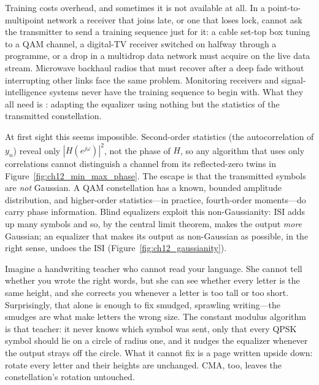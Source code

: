 Training costs overhead, and sometimes it is not available at all. In a point-to-multipoint
network a receiver that joins late, or one that loses lock, cannot ask the transmitter to send a
training sequence just for it: a cable set-top box tuning to a QAM channel, a digital-TV receiver
switched on halfway through a programme, or a drop in a multidrop data network must acquire on the
live data stream. Microwave backhaul radios that must recover after a deep fade without
interrupting other links face the same problem. Monitoring receivers and signal-intelligence
systems never have the training sequence to begin with. What they all need is : adapting the equalizer using nothing but the statistics of the transmitted
constellation.


At first sight this seems impossible. Second-order statistics (the autocorrelation of $y_n$) reveal
only $|H(e^{j\omega})|^2$, not the phase of $H$, so any algorithm that uses only correlations cannot
distinguish a channel from its reflected-zero twins in Figure~\ref{fig:ch12_min_max_phase}. The escape
is that the transmitted symbols are \emph{not} Gaussian. A QAM constellation has a known, bounded
amplitude distribution, and higher-order statistics---in practice, fourth-order moments---do carry
phase information. Blind equalizers exploit this non-Gaussianity: ISI adds up many symbols and so,
by the central limit theorem, makes the output \emph{more} Gaussian; an equalizer that makes its
output as non-Gaussian as possible, in the right sense, undoes the ISI
(Figure~\ref{fig:ch12_gaussianity}).

\begin{analogy}
Imagine a handwriting teacher who cannot read your language. She cannot tell whether you wrote the
right words, but she can see whether every letter is the same height, and she corrects you whenever
a letter is too tall or too short. Surprisingly, that alone is enough to fix smudged, sprawling
writing---the smudges are what make letters the wrong size. The constant modulus algorithm is that
teacher: it never knows which symbol was sent, only that every QPSK symbol should lie on a circle of
radius one, and it nudges the equalizer whenever the output strays off the circle. What it cannot
fix is a page written upside down: rotate every letter and their heights are unchanged. CMA, too,
leaves the constellation's rotation untouched.
\end{analogy}

